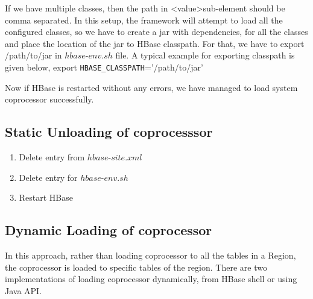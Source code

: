 \documentclass[11pt,a4paper,bibtotoc,idxtotoc,headsepline,footsepline,footexclude,BCOR12mm,DIV13]{scrbook}
\begin{document}
 If we have multiple classes, then the path in \textless value\textgreater \space sub-element should be comma separated. In this setup, the framework will attempt to load all the configured classes, so we have to create a jar with dependencies, for all the classes and place the location of the jar to HBase classpath. For that, we have to export /path/to/jar in $hbase$-$env.sh$ file. A typical example for exporting classpath is given below, \newline \newline
 export \texttt{HBASE\_CLASSPATH}='/path/to/jar' \newline
 
Now if HBase is restarted without any errors, we have managed to load system coprocessor successfully. 

\subsection{Static Unloading of coprocesssor}
\begin{enumerate}
    \item Delete entry from $hbase$-$site.xml$
    \item Delete entry for $hbase$-$env.sh$
    \item Restart HBase
\end{enumerate}

\subsection{Dynamic Loading of coprocessor}
In this approach, rather than loading coprocessor to all the tables in a Region, the coprocessor is loaded to specific tables of the region. There are two implementations of loading coprocessor dynamically, from HBase shell or using Java API\cite{hbase:site}.
\end{document}
